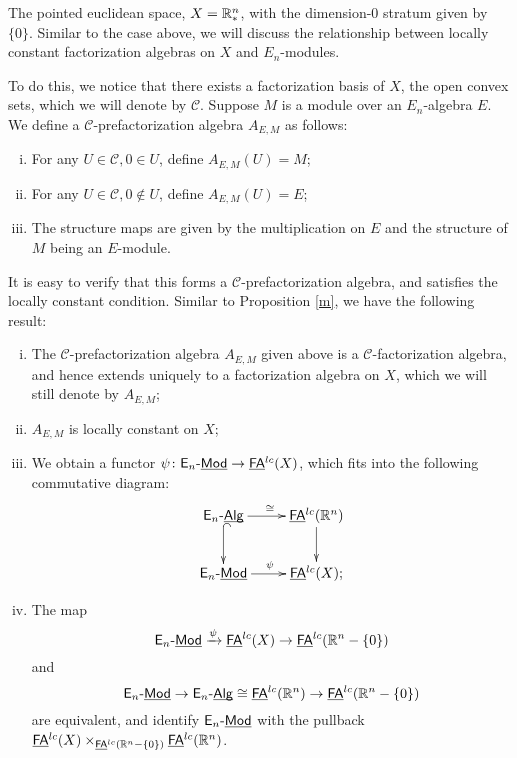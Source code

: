 \documentclass[twoside]{article}
\begin{document}
\begin{example}
    The pointed euclidean space, $X=\mathbb{R}^n_*$, with the dimension-$0$ stratum given by 
    $\{0\}$. Similar to the case above, we will discuss the relationship between 
    locally constant factorization algebras on $X$ and $E_n$-modules.

    To do this, we notice that there exists a factorization basis of $X$, the open
    convex sets, which we will denote by $\mathscr C$. Suppose $M$ is a module
    over an $E_n$-algebra $E$. We define a $\mathscr C$-prefactorization algebra
    $A_{E,M}$ as follows:

    \begin{enumerate}[i)]
        \item For any $U\in\mathscr C,0\in U$, define $A_{E,M}(U)=M$;
        \item For any $U\in\mathscr C,0\notin U$, define $A_{E,M}(U)=E$;
        \item The structure maps are given by the multiplication on $E$ and
        the structure of $M$ being an $E$-module.
    \end{enumerate}

    It is easy to verify that this forms a $\mathscr C$-prefactorization algebra,
    and satisfies the locally constant condition. Similar to Proposition \ref{m},
    we have the following result:

    \begin{proposition}\label{o}
        \begin{enumerate}[i)]
            \item The $\mathscr C$-prefactorization algebra $A_{E,M}$ given above is a 
            $\mathscr C$-factorization algebra, and hence extends uniquely to a factorization
            algebra on $X$, which we will still denote by $A_{E,M}$;
            \item $A_{E,M}$ is locally constant on $X$;
            \item We obtain a functor $\psi\colon\mathsf{E}_n\text{-}\underline{\smash{\mathsf{Mod}}}\to\underline{\smash{\mathsf{FA}}}^{lc}(X)$, which fits into
            the following commutative diagram: $$\xymatrix{\E_n\-\Alg\ar[r]^{\cong}
            \ar@{^(->}[d]&\FA^{lc}(\R^n)\ar[d]\\\E_n\-\Mod\ar[r]^\psi&\FA^{lc}(X);}$$
            \item The map $$\mathsf{E}_n\text{-}\underline{\smash{\mathsf{Mod}}}\xrightarrow{\psi}\underline{\smash{\mathsf{FA}}}^{lc}(X)\to\underline{\smash{\mathsf{FA}}}^{lc}(\mathbb{R}^n-\{0\})$$
            and $$\mathsf{E}_n\text{-}\underline{\smash{\mathsf{Mod}}}\to\mathsf{E}_n\text{-}\underline{\smash{\mathsf{Alg}}}\cong\underline{\smash{\mathsf{FA}}}^{lc}(\mathbb{R}^n)\to\underline{\smash{\mathsf{FA}}}^{lc}(\mathbb{R}^n-\{0\})$$
            are equivalent, and identify $\mathsf{E}_n\text{-}\underline{\smash{\mathsf{Mod}}}$ with the pullback $\underline{\smash{\mathsf{FA}}}^{lc}(X)\times_
            {\underline{\smash{\mathsf{FA}}}^{lc}(\mathbb{R}^n-\{0\})}\underline{\smash{\mathsf{FA}}}^{lc}(\mathbb{R}^n)$.
        \end{enumerate}
    \end{proposition}


\end{example}
\end{document}
